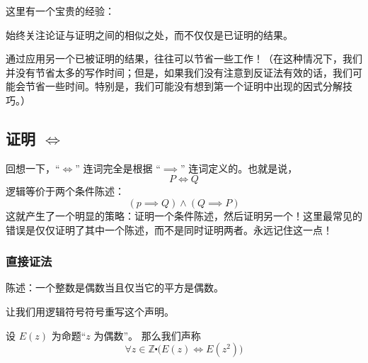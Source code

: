 这里有一个宝贵的经验：

\begin{center}
    始终关注论证与证明之间的相似之处，而不仅仅是已证明的结果。
\end{center}

通过应用另一个已被证明的结果，往往可以节省一些工作！（在这种情况下，我们并没有节省太多的写作时间；但是，如果我们没有注意到反证法有效的话，我们可能会节省一些时间。特别是，我们可能没有想到第一个证明中出现的因式分解技巧。）

\subsection{证明 $\iff$}\label{sec:section4.9.6}

回想一下，``$\iff$'' 连词完全是根据 ``$\implies$'' 连词定义的。也就是说，
\[P \iff Q\]
逻辑等价于两个条件陈述：
\[(p \implies Q) \land (Q \implies P)\]
这就产生了一个明显的策略：证明一个条件陈述，然后证明另一个！这里最常见的错误是仅仅证明了其中一个陈述，而不是同时证明两者。永远记住这一点！

\subsubsection*{直接证法}

\begin{center}
    \noindent {}
\end{center}

\begin{example}[偶数的平方为偶数]

    陈述：一个整数是偶数当且仅当它的平方是偶数。

    让我们用逻辑符号符号重写这个声明。
    
    设 $E(z)$ 为命题``$z$ 为偶数''。 那么我们声称
    \[\forall z \in \mathbb{Z} \centerdot \Big(E(z) \iff E(z^2)\Big)\]
\end{example}

